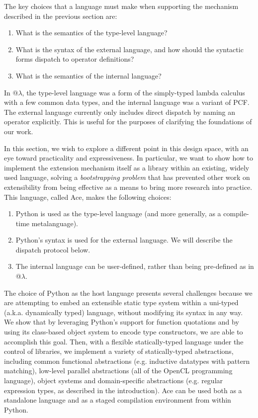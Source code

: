 The key choices that a language must make when supporting the mechanism described in the previous section are:
\begin{enumerate}
\item What is the semantics of the type-level language?
\item What is the syntax of the external language, and how should the syntactic forms dispatch to  operator definitions?
\item What is the semantics of the internal language?
\end{enumerate}

In @$\lambda$, the type-level language was a form of the simply-typed lambda calculus with a few common data types, and the internal language was a variant of PCF. The external language currently only includes direct dispatch by naming an operator explicitly. This is useful for the purposes of clarifying the foundations of our work.

In this section, we wish to explore a different point in this design space, with an eye toward practicality and expressiveness. In particular, we want to show how to implement {the extension mechanism itself} as a library within an existing, widely used language, solving a \emph{bootstrapping problem} that has prevented  other work on extensibility from being effective as a means to bring more research into practice. This language, called Ace, makes the following choices:

\begin{enumerate}
\item Python is used as the type-level language (and more generally, as a compile-time metalanguage).
\item Python's syntax is used for the external language. We will describe the dispatch protocol below.
\item The internal language can be user-defined, rather than being pre-defined as in @$\lambda$.
\end{enumerate}

The choice of Python as the host language presents several challenges because we are attempting to embed an extensible static type system within a uni-typed (a.k.a. dynamically typed) language, without modifying its syntax in any way. We show that by leveraging Python's support for function quotations and by using its class-based object system to encode type constructors, we are able to accomplish this goal. Then, with a flexible statically-typed language under the control of libraries, we implement a variety of statically-typed abstractions, including common functional abstractions (e.g. inductive datatypes with pattern matching), low-level parallel abstractions (all of the OpenCL programming language), object systems and domain-specific abstractions (e.g. regular expression types, as described in the introduction). Ace can be used both as a standalone language and as a staged compilation environment from within Python.

